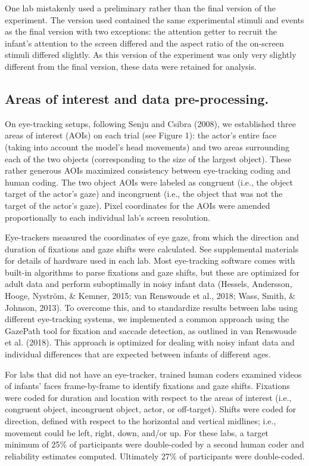 \documentclass[
  english,
  ,man,floatsintext]{apa6}
\begin{document}
One lab mistakenly used a preliminary rather than the final version of the experiment. The version used contained the same experimental stimuli and events as the final version with two exceptions: the attention getter to recruit the infant's attention to the screen differed and the aspect ratio of the on-screen stimuli differed slightly. As this version of the experiment was only very slightly different from the final version, these data were retained for analysis.

\hypertarget{areas-of-interest-and-data-pre-processing.}{%
\subsection{Areas of interest and data pre-processing.}\label{areas-of-interest-and-data-pre-processing.}}

On eye-tracking setups, following Senju and Csibra (2008), we established three areas of interest (AOIs) on each trial (see Figure 1): the actor's entire face (taking into account the model's head movements) and two areas surrounding each of the two objects (corresponding to the size of the largest object). These rather generous AOIs maximized consistency between eye-tracking coding and human coding. The two object AOIs were labeled as congruent (i.e., the object target of the actor's gaze) and incongruent (i.e., the object that was not the target of the actor's gaze). Pixel coordinates for the AOIs were amended proportionally to each individual lab's screen resolution.

Eye-trackers measured the coordinates of eye gaze, from which the direction and duration of fixations and gaze shifts were calculated. See supplemental materials for details of hardware used in each lab. Most eye-tracking software comes with built-in algorithms to parse fixations and gaze shifts, but these are optimized for adult data and perform suboptimally in noisy infant data (Hessels, Andersson, Hooge, Nyström, \& Kemner, 2015; van Renswoude et al., 2018; Wass, Smith, \& Johnson, 2013). To overcome this, and to standardize results between labs using different eye-tracking systems, we implemented a common approach using the GazePath tool for fixation and saccade detection, as outlined in van Renswoude et al. (2018). This approach is optimized for dealing with noisy infant data and individual differences that are expected between infants of different ages.

For labs that did not have an eye-tracker, trained human coders examined videos of infants' faces frame-by-frame to identify fixations and gaze shifts. Fixations were coded for duration and location with respect to the areas of interest (i.e., congruent object, incongruent object, actor, or off-target). Shifts were coded for direction, defined with respect to the horizontal and vertical midlines; i.e., movement could be left, right, down, and/or up. For these labs, a target minimum of 25\% of participants were double-coded by a second human coder and reliability estimates computed. Ultimately 27\% of participants were double-coded.
\end{document}
